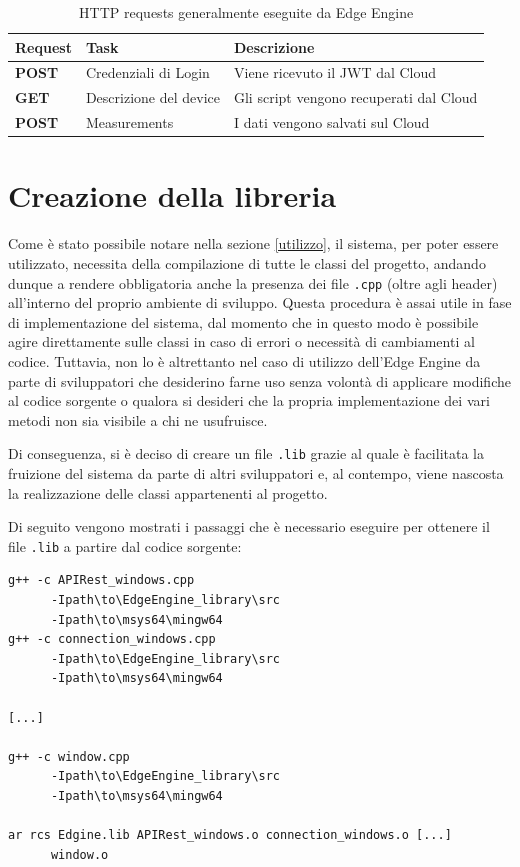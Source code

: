 \begin{table}[H]
	\centering
	\begin{tabular}{|l|l|l|}
		\hline
		\textbf{Request} & \textbf{Task} & \textbf{Descrizione}\\
		\hline
		\textbf{POST} & Credenziali di Login & Viene ricevuto il JWT dal Cloud\\
		\hline
		\textbf{GET} & Descrizione del device & Gli script vengono recuperati dal Cloud\\
		\hline
		\textbf{POST} & Measurements & I dati vengono salvati sul Cloud\\	
		\hline
	\end{tabular}
	\caption{HTTP requests generalmente eseguite da Edge Engine}
	\label{loop}
\end{table}

\section{Creazione della libreria}
Come è stato possibile notare nella sezione \ref{utilizzo}, il sistema, per poter essere utilizzato, necessita della compilazione di tutte le classi del progetto, andando dunque a rendere obbligatoria anche la presenza dei file \texttt{.cpp} (oltre agli header) all'interno del proprio ambiente di sviluppo. Questa procedura è assai utile in fase di implementazione del sistema, dal momento che in questo modo è possibile agire direttamente sulle classi in caso di errori o necessità di cambiamenti al codice. Tuttavia, non lo è altrettanto nel caso di utilizzo dell'Edge Engine da parte di sviluppatori che desiderino farne uso senza volontà di applicare modifiche al codice sorgente o qualora si desideri che la propria implementazione dei vari metodi non sia visibile a chi ne usufruisce.

Di conseguenza, si è deciso di creare un file \texttt{.lib} grazie al quale è facilitata la fruizione del sistema da parte di altri sviluppatori e, al contempo, viene nascosta la realizzazione delle classi appartenenti al progetto.

Di seguito vengono mostrati i passaggi che è necessario eseguire per ottenere il file \texttt{.lib} a partire dal codice sorgente:

\begin{verbatim}
g++ -c APIRest_windows.cpp 
      -Ipath\to\EdgeEngine_library\src 
      -Ipath\to\msys64\mingw64 
g++ -c connection_windows.cpp 
      -Ipath\to\EdgeEngine_library\src 
      -Ipath\to\msys64\mingw64 

[...]

g++ -c window.cpp
      -Ipath\to\EdgeEngine_library\src 
      -Ipath\to\msys64\mingw64 
 
ar rcs Edgine.lib APIRest_windows.o connection_windows.o [...] 
      window.o
\end{verbatim}


